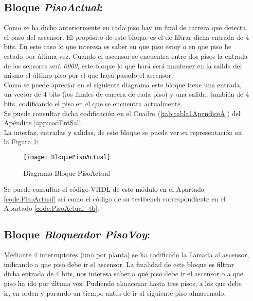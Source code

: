 \subsection{Bloque \textit{PisoActual}:} \label{bloque:PisoActual}
    Como se ha dicho anteriormente en cada piso hay un final de carrera que detecta el paso del ascensor. El propósito de este bloque es el de filtrar dicha entrada de 4 bits. En este caso lo que interesa es saber en que piso estoy o en que piso he estado por última vez. Cuando el ascensor se encuentra entre dos pisos la entrada de los sensores será \textit{0000}, este bloque lo que hará será mantener en la salida del mismo el último piso por el que haya pasado el ascensor. \\ 
    
    Como se puede apreciar en el siguiente diagrama este bloque tiene una entrada, un vector de 4 bits (los finales de carrera de cada piso) y una salida, también de 4 bits, codificando el piso en el que se encuentra actualmente. \\ 
    
    Se puede consultar dicha codificación en el Cuadro (\ref{tab:tabla1ApendiceA}) del Apéndice \ref{app:codEntSal}. \\ 
    
    La interfaz, entradas y salidas, de este bloque se puede ver su representación en la Figura \ref{fig:BloquePisoActual}:
    
    \begin{figure}[H]
		    \centering
		    \hspace*{-1.8cm}
		    \texttt{[image: BloquePisoActual]}
		    \caption{Diagrama Bloque PisoActual}
		    \label{fig:BloquePisoActual}
	\end{figure}
	
	Se puede consultar el código VHDL de este módulo en el Apartado \ref{code:PisoActual} así como el código de su testbench correspondiente en el Apartado \ref{code:PisoActual_tb}.\\ 

\subsection{Bloque \textit{Bloqueador PisoVoy}:} \label{bloque:BloqueadorPisoVoy}
    Mediante 4 interruptores (uno por planta) se ha codificado la llamada al ascensor, indicando a que piso debe ir el ascensor. La finalidad de este bloque es filtrar dicha entrada de 4 bits, nos interesa saber a qué piso debe ir el ascensor o a que piso ha ido por última vez. Pudiendo almacenar hasta tres pisos, a los que debe ir, en orden y parando un tiempo antes de ir al siguiente piso almacenado. \\
    
